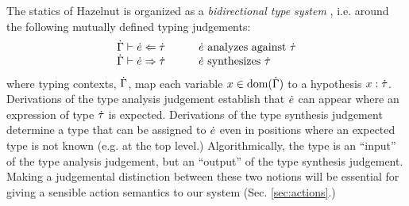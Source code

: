 \documentclass{llncs}
\begin{document}
The statics of Hazelnut is organized as a \emph{bidirectional type system} \cite{Pierce:2000:LTI:345099.345100}, i.e. around the following mutually defined typing judgements:
\[\arraycolsep=15pt\begin{array}{ll}
\hana{\hGamma}{\hexp}{\htau} & \text{$\hexp$ analyzes against $\htau$}\\
\hsyn{\hGamma}{\hexp}{\htau} & \text{$\hexp$ synthesizes $\htau$}
\end{array}\]
where typing contexts, $\dot{\Gamma}$, map each variable $x \in \text{dom}(\dot{\Gamma})$ to a hypothesis $x : \dot{\tau}$.
Derivations of the type analysis judgement establish that $\dot{e}$ can appear where an expression of type $\dot{\tau}$ is expected. Derivations of the type synthesis judgement determine a type that can be assigned to $\dot{e}$ even in positions where an expected type is not known (e.g. at the top level.) Algorithmically, the type is an ``input'' of the type analysis judgement, but an ``output'' of the type synthesis judgement. %
Making a judgemental distinction between these two notions will be essential for giving a sensible action semantics to our system (Sec. \ref{sec:actions}.)

\end{document}
